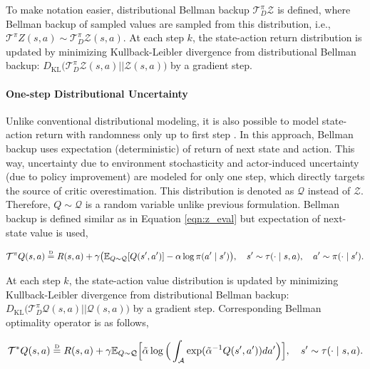 \documentclass{article}
\newcommand\disteq{\mathrel{\stackrel{\makebox[0pt]{\mbox{\normalfont\tiny D}}}{=}}}
\begin{document}
To make notation easier, distributional Bellman backup $\mathcal{T}^{\pi}_{D}\mathcal{Z}$ is defined, where Bellman backup of sampled values are sampled from this distribution, i.e., $\mathcal{T}^{\pi} Z(s,a) \sim \mathcal{T}^{\pi}_{D}\mathcal{Z}(s, a)$. At each step $k$, the state-action return distribution is updated by minimizing Kullback-Leibler divergence from distributional Bellman backup: $D_{\mathrm{KL}} \big( \mathcal{T}^{\pi}_{D}\mathcal{Z}(s, a) || \mathcal{Z}(s, a) \big)$ by a gradient step. 

\paragraph{One-step Distributional Uncertainty} Unlike conventional distributional modeling, it is also possible to model state-action return with randomness only up to first step \citet{achab2020ranking, achab2023one}. In this approach, Bellman backup uses expectation (deterministic) of return of next state and action. This way, uncertainty due to environment stochasticity and actor-induced uncertainty (due to policy improvement) are modeled for only one step, which directly targets the source of critic overestimation. This distribution is denoted as $\mathcal{Q}$ instead of $\mathcal{Z}$. Therefore, $Q\sim\mathcal{Q}$ is a random variable unlike previous formulation. Bellman backup is defined similar as in Equation \ref{eqn:z_eval} but expectation of next-state value is used, 

\begin{equation}
	\label{eqn:q_evs_eval}
	\mathcal{T}^{\pi} Q(s,a) \disteq R(s,a) + \gamma \big( \mathbb{E}_{Q\sim\mathcal{Q}}[Q(s',a')] - \alpha \log \pi(a' \mid s') \big), \quad s'\sim\tau(\cdot \mid s,a), \quad a' \sim \pi(\cdot \mid s'). 
\end{equation}

At each step $k$, the state-action value distribution is updated by minimizing Kullback-Leibler divergence from distributional Bellman backup: $D_{\mathrm{KL}} \big( \mathcal{T}^{\pi}_{D}\mathcal{Q}(s, a) || \mathcal{Q}(s, a) \big)$ by a gradient step. Corresponding Bellman optimality operator is as follows, 

\begin{equation}
	\label{eqn:q_optimal}
	\mathcal{T}^{*} Q(s,a) \disteq R(s,a) + \gamma \mathbb{E}_{Q\sim\mathcal{Q}} \Big[ \Tilde{\alpha} \log \Big( \int_{\mathcal{A}} \exp({\Tilde{\alpha}}^{-1} {Q}(s',a')) da' \Big) \Big], \quad s'\sim\tau(\cdot \mid s,a). 
\end{equation}
\end{document}
